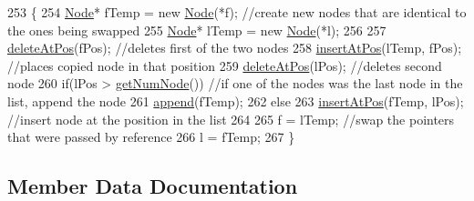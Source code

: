 \begin{DoxyCode}
253 \{
254    \hyperlink{classNode}{Node}* fTemp = \textcolor{keyword}{new} \hyperlink{classNode_a0ac1d44cfe588be564acf25485029bd8}{Node}(*f); \textcolor{comment}{//create new nodes that are identical to the ones being swapped     
                                                                                                               }
255    \hyperlink{classNode}{Node}* lTemp = \textcolor{keyword}{new} \hyperlink{classNode_a0ac1d44cfe588be564acf25485029bd8}{Node}(*l);
256 
257    \hyperlink{classLinkedList_a62a89a30509d38b88c75177b8efa9a98}{deleteAtPos}(fPos); \textcolor{comment}{//deletes first of the two nodes                                          
                                                                                                                  }
258    \hyperlink{classLinkedList_aa7b12c5f9bb22be91012d68c9da0b431}{insertAtPos}(lTemp, fPos); \textcolor{comment}{//places copied node in that position                              
                                                                                                                  }
259    \hyperlink{classLinkedList_a62a89a30509d38b88c75177b8efa9a98}{deleteAtPos}(lPos); \textcolor{comment}{//deletes second node                                                     
                                                                                                                  }
260    \textcolor{keywordflow}{if}(lPos > \hyperlink{classLinkedList_ae04dbbcae32f8fb03dce3e174854981f}{getNumNode}()) \textcolor{comment}{//if one of the nodes was the last node in the list, append the node  
                                                                                                                 }
261       \hyperlink{classLinkedList_ac2f92598858e9ba02af8722fba803c53}{append}(fTemp);
262    \textcolor{keywordflow}{else}
263       \hyperlink{classLinkedList_aa7b12c5f9bb22be91012d68c9da0b431}{insertAtPos}(fTemp, lPos); \textcolor{comment}{//insert node at the position in the list                       
                                                                                                                  }
264 
265    f = lTemp; \textcolor{comment}{//swap the pointers that were passed by reference                                            
                                                                                                       }
266    l = fTemp;
267 \}
\end{DoxyCode}


\subsection{Member Data Documentation}
